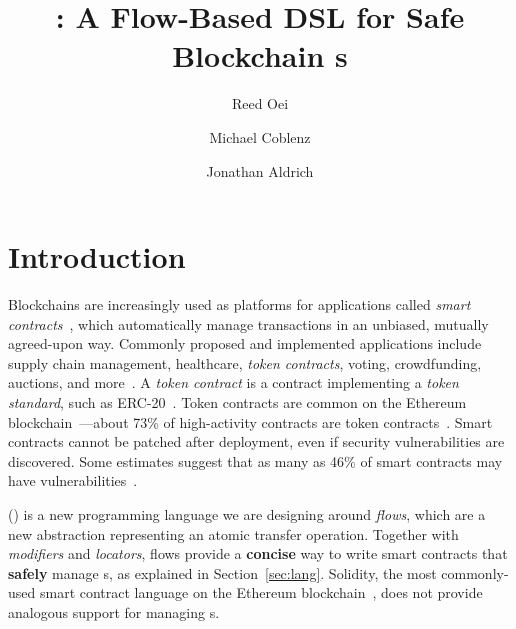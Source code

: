 \documentclass[dvipsnames,runningheads]{llncs}
\begin{document}
\title{\langName: A Flow-Based DSL for Safe Blockchain \AssetTxt{}s}

\author{Reed Oei \and Michael Coblenz \and Jonathan Aldrich}

\maketitle

\section{Introduction}
Blockchains are increasingly used as platforms for applications called \emph{smart contracts}~\cite{Szabo97:Formalizing}, which automatically manage transactions in an unbiased, mutually agreed-upon way.
Commonly proposed and implemented applications include supply chain management, healthcare, \emph{token contracts}, voting, crowdfunding, auctions, and more~\cite{SupplyChainUse,HealthcareUse,Elsden18:Making}.
A \emph{token contract} is a contract implementing a \emph{token standard}, such as ERC-20~\cite{erc20}.
Token contracts are common on the Ethereum blockchain~\cite{wood2014ethereum}---about 73\% of high-activity contracts are token contracts~\cite{OlivaEtAl2019}.
Smart contracts cannot be patched after deployment, even if security vulnerabilities are discovered.
Some estimates suggest that as many as 46\% of smart contracts may have vulnerabilities~\cite{luuOyente}.

\langName (\langNamePronounce) is a new programming language we are designing around \emph{flows}, which are a new abstraction representing an atomic transfer operation.
Together with \emph{modifiers} and \emph{locators}, flows provide a \textbf{concise} way to write smart contracts that \textbf{safely} manage \assetTxt{}s, as explained in Section~\ref{sec:lang}.
Solidity, the most commonly-used smart contract language on the Ethereum blockchain~\cite{EthereumForDevs}, does not provide analogous support for managing \assetTxt{}s.
\end{document}
